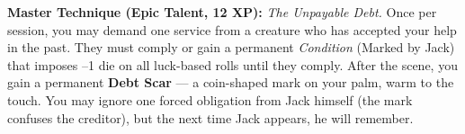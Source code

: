 \begin{tcolorbox}[colback=black!5,colframe=gold!80!black,title=\textbf{Magpie Monk (Lucky Jack)},breakable]
  \vspace{2mm}
  \noindent\textbf{Master Technique (Epic Talent, 12 XP):}
  \textit{The Unpayable Debt.} Once per session, you may demand one service from a creature who has accepted your help in the past. They must comply or gain a permanent \textit{Condition} (Marked by Jack) that imposes --1 die on all luck-based rolls until they comply. After the scene, you gain a permanent \textbf{Debt Scar} --- a coin-shaped mark on your palm, warm to the touch. You may ignore one forced obligation from Jack himself (the mark confuses the creditor), but the next time Jack appears, he will remember.
\end{tcolorbox}